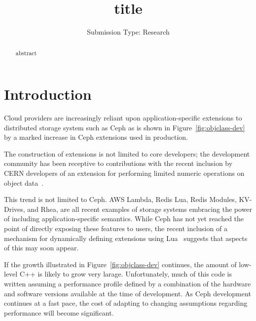 \documentclass[10pt,twocolumn]{article}
\begin{document}
\title{title}

\author{
\small Submission Type: Research
}

\date{}
\maketitle

\begin{abstract}
abstract
\end{abstract}

\section{Introduction}

Cloud providers are increasingly reliant upon application-specific extensions
to distributed storage system such as Ceph as is shown in
Figure~\ref{fig:objclass-dev} by a marked increase in Ceph extensions used in
production.

The construction of extensions is not limited to core developers; the
development community has been receptive to contributions with the recent
inclusion by CERN developers of an extension for performing limited numeric
operations on object data~\cite{cls_numops}.

This trend is not limited to Ceph. AWS Lambda, Redis Lua, Redis Modules,
KV-Drives, and Rhea, are all recent examples of storage systems embracing the
power of including application-specific semantics. While Ceph has not yet
reached the point of directly exposing these features to users, the recent
inclusion of a mechanism for dynamically defining extensions using
Lua~\cite{cls_lua} suggests that aspects of this may soon appear.

If the growth illustrated in Figure~\ref{fig:objclass-dev} continues, the
amount of low-level C++ is likely to grow very larage. Unfortunately, much of
this code is written assuming a performance profile defined by a combination
of the hardware and software versions available at the time of development. As
Ceph development continues at a fast pace, the cost of adapting to changing
assumptions regarding performance will become significant.
\end{document}
